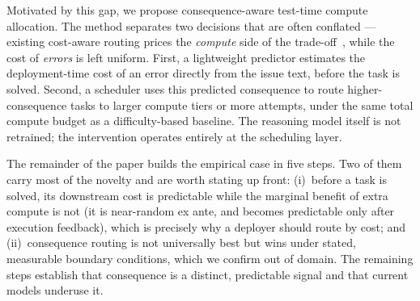 \documentclass{article}
\begin{document}
Motivated by this gap, we propose consequence-aware test-time
compute allocation.
The method separates two decisions that are often conflated ---
existing cost-aware routing prices the \emph{compute} side of the
trade-off~\citep{shirkavand2025costaware}, while the cost of
\emph{errors} is left uniform.
First, a lightweight predictor estimates the deployment-time
cost of an error directly from the issue text, before the task is
solved.
Second, a scheduler uses this predicted consequence to route
higher-consequence tasks to larger compute tiers or more attempts,
under the same total compute budget as a difficulty-based baseline.
The reasoning model itself is not retrained;
the intervention operates entirely at the scheduling layer.

The remainder of the paper builds the empirical case in five steps.
Two of them carry most of the novelty and are worth stating up front:
(i)~before a task is solved, its downstream cost is predictable while
the marginal benefit of extra compute is not (it is near-random ex
ante, and becomes predictable only after execution feedback), which is
precisely why a deployer should route by cost; and (ii)~consequence
routing is not universally best but wins under stated, measurable
boundary conditions, which we confirm out of domain. The remaining
steps establish that consequence is a distinct, predictable signal and
that current models underuse it.
\end{document}
